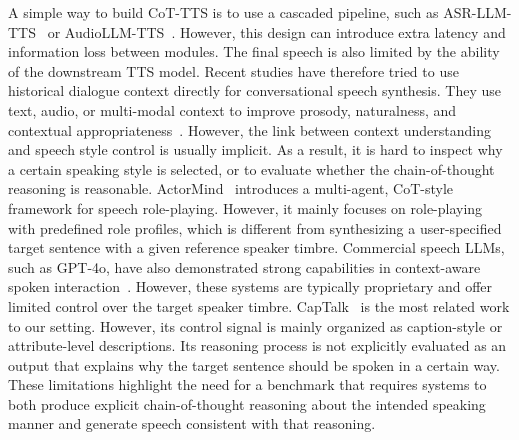 \documentclass[a4paper]{article}
\begin{document}
\noindent A simple way to build CoT-TTS is to use a cascaded pipeline, such as ASR-LLM-TTS~\cite{yang2026duplexcascade} or AudioLLM-TTS~\cite{li2024style}. However, this design can introduce extra latency and information loss between modules. The final speech is also limited by the ability of the downstream TTS model. Recent studies have therefore tried to use historical dialogue context directly for conversational speech synthesis. They use text, audio, or multi-modal context to improve prosody, naturalness, and contextual appropriateness~\cite{xue2023m,seong2024h4c,wu2025diffcss,deng2023cmcu}. However, the link between context understanding and speech style control is usually implicit. As a result, it is hard to inspect why a certain speaking style is selected, or to evaluate whether the chain-of-thought reasoning is reasonable. ActorMind~\cite{chen2026actormind} introduces a multi-agent, CoT-style framework for speech role-playing. However, it mainly focuses on role-playing with predefined role profiles, which is different from synthesizing a user-specified target sentence with a given reference speaker timbre. Commercial speech LLMs, such as GPT-4o, have also demonstrated strong capabilities in context-aware spoken interaction~\cite{lin2025preliminary,hurst2024gpt}. However, these systems are typically proprietary and offer limited control over the target speaker timbre. CapTalk~\cite{su2026captalk} is the most related work to our setting. However, its control signal is mainly organized as caption-style or attribute-level descriptions. Its reasoning process is not explicitly evaluated as an output that explains why the target sentence should be spoken in a certain way. These limitations highlight the need for a benchmark that requires systems to both produce explicit chain-of-thought reasoning about the intended speaking manner and generate speech consistent with that reasoning.\\
\end{document}
